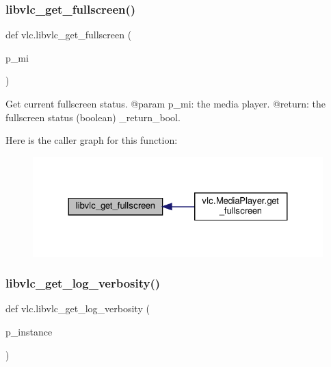 \subsubsection{\texorpdfstring{libvlc\+\_\+get\+\_\+fullscreen()}{libvlc\_get\_fullscreen()}}
{\footnotesize\ttfamily def vlc.\+libvlc\+\_\+get\+\_\+fullscreen (\begin{DoxyParamCaption}\item[{}]{p\+\_\+mi }\end{DoxyParamCaption})}

\begin{DoxyVerb}Get current fullscreen status.
@param p_mi: the media player.
@return: the fullscreen status (boolean) \libvlc_return_bool.
\end{DoxyVerb}
 Here is the caller graph for this function\+:
\nopagebreak
\begin{figure}[H]
\begin{center}
\leavevmode
\includegraphics[width=324pt]{namespacevlc_a9533bb014114561474c90a91497dc7d6_icgraph}
\end{center}
\end{figure}
\mbox{\label{namespacevlc_a137f63c88981266f69851dd13a25658e}} 
\subsubsection{\texorpdfstring{libvlc\+\_\+get\+\_\+log\+\_\+verbosity()}{libvlc\_get\_log\_verbosity()}}
{\footnotesize\ttfamily def vlc.\+libvlc\+\_\+get\+\_\+log\+\_\+verbosity (\begin{DoxyParamCaption}\item[{}]{p\+\_\+instance }\end{DoxyParamCaption})}

